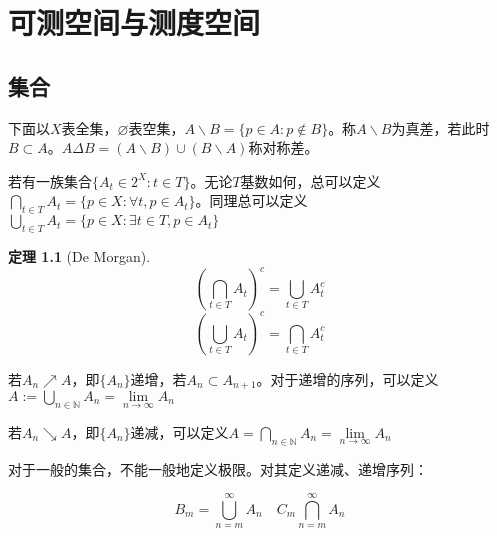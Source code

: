 \documentclass{ctexart}
\begin{document}
\newcommand{\R}{\mathbb{R}}
\newcommand{\N}{\mathbb{N}}
\newcommand{\dd}{\,\mathrm{d}}
\newcommand{\st}{\text{ s.t. }}
\newcommand{\pp}[2]{\frac{\partial #1}{\partial #2}}
\newcommand{\dif}[2]{\frac{\mathrm{d}#1}{\mathrm{d}#2}}
\newcommand{\nm}[1]{\left\|#1\right\|}
\newcommand{\dual}[1]{\left<#1\right>}
\newcommand{\wto}{\rightharpoonup}
\newcommand{\wsto}{\stackrel{*}{\rightharpoonup}}
\newcommand{\cvin}{\text{ in }}
\newcommand{\alev}{\text{ a.e. }}
\newcommand{\alsu}{\text{ a.s. }}
\newcommand{\E}{\mathcal{E}}
\newcommand{\F}{\mathscr{F}}
\newcommand{\G}{\mathscr{G}}
\newcommand{\Bor}{\mathscr{B}}
\newcommand{\pw}{\text{ p.w. }}
\newcommand{\inof}{\text{ i.o. }}
\newcommand{\X}{\bm{X}}
\newcommand{\iid}{\mathrm{i.i.d.}~}
\newcommand{\C}{\mathbb{C}}

\newtheorem{Thm}{定理}[section]
\newtheorem{Lemma}[Thm]{引理}
\newtheorem{Prop}[Thm]{命题}
\newtheorem{Cor}[Thm]{推论}
\newtheorem{Def}{定义}[section]
\newtheorem{Rmk}{注}[section]
\newtheorem{Eg}{例}[section]
\else
\chapter{可测空间与测度空间}
\fi
\section{集合}
下面以$X$表全集，$\varnothing$表空集，$A\backslash B=\{p\in A:p\not \in B\}$。称$A\backslash B$为真差，若此时$B\subset A$。$A\Delta B=(A\backslash B)\cup(B\backslash A)$称对称差。

若有一族集合$\{A_{t}\in 2^{X}:t\in T\}$。无论$T$基数如何，总可以定义$\bigcap_{t\in T}A_{t}=\{p\in X:\forall t,p\in A_{t}\}$。同理总可以定义$\bigcup_{t\in T}A_{t}=\{p\in X:\exists t\in T, p\in A_{t}\}$

\begin{Thm}[De Morgan]
  \[(\bigcap_{t\in T}A_{t})^{c}=\bigcup_{t\in T}A_{t}^{c}\]
  \[(\bigcup_{t\in T}A_{t})^{c}=\bigcap_{t\in T}A_{t}^{c}\]
  
\end{Thm}
若$A_{n}\nearrow A$，即$\{A_{n}\}$递增，若$A_{n}\subset A_{n+1}$。对于递增的序列，可以定义$A:=\bigcup_{n\in\mathbb{N}}A_{n}=\lim\limits_{n\to\infty}A_{n}$

若$A_{n}\searrow A$，即$\{A_{n}\}$递减，可以定义$A=\bigcap_{n\in\mathbb{N}}A_{n}=\lim\limits_{n\to\infty}A_{n}$

对于一般的集合，不能一般地定义极限。对其定义递减、递增序列：

\[B_{m}=\bigcup_{n=m}^{\infty}A_{n}\quad C_{m}\bigcap_{n=m}^{\infty}A_{n}\]
\end{document}
